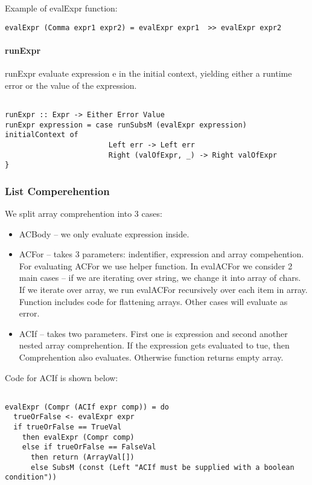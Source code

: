 \documentclass[11pt]{article}
\begin{document}
Example of evalExpr function:

\begin{verbatim}
evalExpr (Comma expr1 expr2) = evalExpr expr1  >> evalExpr expr2

\end{verbatim}



\paragraph{runExpr}
runExpr evaluate expression e in the initial context, yielding either a runtime error or the value of the expression.
\begin{verbatim}

runExpr :: Expr -> Either Error Value
runExpr expression = case runSubsM (evalExpr expression) initialContext of
  						Left err -> Left err
  						Right (valOfExpr, _) -> Right valOfExpr
}
\end{verbatim}

\subsubsection{List Comperehention}

We split array comprehention into 3 cases: 
\begin{itemize}
\item ACBody -- we only evaluate expression inside.
\item ACFor -- takes 3 parameters: indentifier, expression and array compehention. For evaluating ACFor we use helper function. In evalACFor we consider 2 main cases -- if we are iterating over string, we change it into array of chars. If we iterate over array, we run evalACFor recursively over each item in array. Function includes code for flattening arrays. Other cases will evaluate as error. 
\item ACIf -- takes two parameters. First one is expression and second another nested array comprehention. If the expression gets evaluated to tue, then Comprehention also evaluates. Otherwise function returns empty array.

\end{itemize}
Code for ACIf is shown below:
\begin{verbatim}

evalExpr (Compr (ACIf expr comp)) = do
  trueOrFalse <- evalExpr expr
  if trueOrFalse == TrueVal
    then evalExpr (Compr comp)
    else if trueOrFalse == FalseVal
      then return (ArrayVal[])
      else SubsM (const (Left "ACIf must be supplied with a boolean condition"))
\end{verbatim} 
\end{document}
